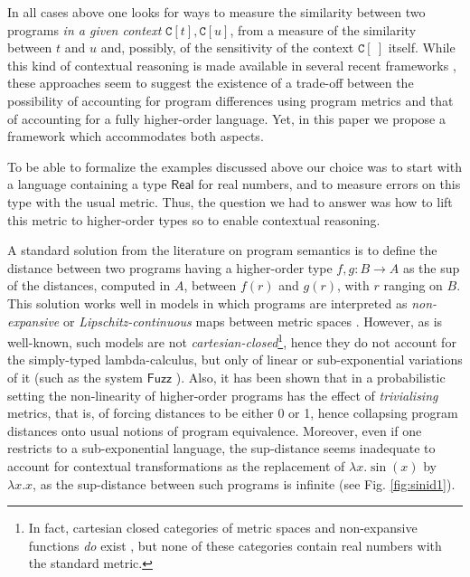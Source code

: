  In all cases above one looks for ways to measure the similarity between two programs \emph{in a given context} $\mathtt C[t], \mathtt C[u]$, from a measure of the similarity between $t$ and $u$ and, possibly, of the sensitivity of the context $\mathtt C[\ ]$ itself.  
  While this kind of contextual reasoning is made available in several recent frameworks \cite{10.1145/1932681.1863568,Gaboardi_2013,Azevedo_de_Amorim_2017,chaudhuri, dallago:differential-stlc},  these approaches seem to suggest the existence of a trade-off between the possibility of accounting for 
program differences using program metrics and that of accounting for  a fully higher-order language. Yet, in this paper we propose a framework which accommodates both aspects. 

%




To be able to formalize the examples discussed above our choice was to start with a language containing a type $\mathsf{Real}$ for real numbers, and to measure errors on this type with the usual metric. Thus, the question we had to answer was how to lift this metric to higher-order types so to enable contextual reasoning.



A standard solution from the literature on program semantics is to define the distance between two programs having a higher-order type $f,g:B\to A$ as the sup of the distances, computed in $A$, between $f(r)$ and $g(r)$, with $r$ ranging on $B$.
This solution works well in models in which programs are interpreted as \emph{non-expansive} or \emph{Lipschitz-continuous} maps between metric spaces \cite{}. However, as is well-known, such models are not \emph{cartesian-closed}\footnote{In fact, cartesian closed categories of metric spaces and non-expansive functions \emph{do} exist \cite{}, but none of these categories contain real numbers with the standard metric.}, hence they do not account for 
 the simply-typed lambda-calculus, but only of linear or sub-exponential variations of it (such as the system $\mathsf{Fuzz}$ \cite{10.1145/1932681.1863568,Gaboardi_2013,Azevedo_de_Amorim_2017}).
 Also, it has been shown \cite{10.1109/LICS.2015.64} that in a probabilistic setting the non-linearity of higher-order programs has the effect of \emph{trivialising} metrics, that is, of forcing distances to be either 0 or 1, hence collapsing program distances onto usual notions of program equivalence.
Moreover, even if one restricts to a sub-exponential language, the sup-distance seems inadequate to account for contextual transformations as the replacement of $\lambda x.\sin(x)$ by $\lambda x.x$,  as the sup-distance between such programs is infinite (see Fig. \ref{fig:sinid1}). 
 
